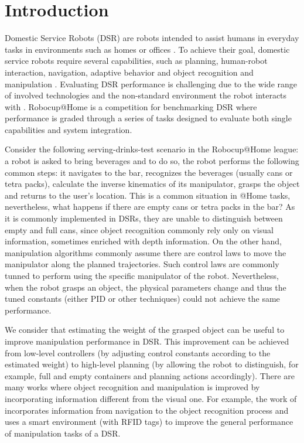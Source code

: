 \documentclass[smallextended]{svjour3}       %
\begin{document}
\section{Introduction}
Domestic Service Robots (DSR) are robots intended to assist humans in everyday tasks in environments such as homes or offices \cite{engelberger_robotics_1989}. To achieve their goal, domestic service robots require several capabilities, such as planning, human-robot interaction, navigation, adaptive behavior and object recognition and manipulation \cite{hutchison_robocuphome_2010}. Evaluating DSR performance is challenging due to the wide range of involved technologies and the non-standard environment the robot interacts with \cite{wisspeintner_robocuphome_2009}. Robocup@Home is a competition for benchmarking DSR where performance is graded through a series of tasks designed to evaluate both single capabilities and system integration. 

Consider the following serving-drinks-test scenario in the Robocup@Home league: a robot is asked to bring beverages and to do so, the robot performs the following common steps: it navigates to the bar, recognizes the beverages (usually cans or tetra packs), calculate the inverse kinematics of its manipulator, grasps the object and returns to the user's location. This is a common situation in @Home tasks, nevertheless, what happens if there are empty cans or tetra packs in the bar? As it is commonly implemented in DSRs, they are unable to distinguish between empty and full cans, since object recognition commonly rely only on visual information, sometimes enriched with depth information. On the other hand, manipulation algorithms commonly assume there are control laws to move the manipulator along the planned trajectories. Such control laws are commonly tunned to perform using the specific manipulator of the robot. Nevertheless, when the robot grasps an object, the physical parameters change and thus the tuned constants (either PID or other techniques) could not achieve the same performance.

We consider that estimating the weight of the grasped object can be useful to improve manipulation performance in DSR. This improvement can be achieved from low-level controllers (by adjusting control constants according to the estimated weight) to high-level planning (by allowing the robot to distinguish, for example, full and empty containers and planning actions accordingly). There are many works where object recognition and manipulation is improved by incorporating information different from the visual one. For example, the work of \cite{ekvall_integrating_2006} incorporates information from navigation to the object recognition process and \cite{jae-han_park_new_2007} uses a smart environment (with RFID tags) to improve the general performance of manipulation tasks of a DSR. 
\end{document}
